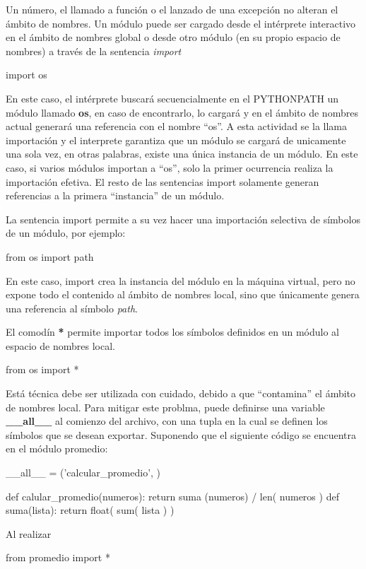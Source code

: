 \documentclass[a4paper]{report}
\begin{document}
Un número, el llamado a función o el lanzado de una excepción no alteran el ámbito de nombres.
Un módulo puede ser cargado desde el intérprete interactivo en el ámbito de nombres global
o desde otro módulo (en su propio espacio de nombres) a través de 
la sentencia \emph{import}
\begin{python}
import os
\end{python}
En este caso, el intérprete buscará secuencialmente en el PYTHONPATH un módulo llamado \textbf{os}, 
en caso de encontrarlo, lo cargará y en el ámbito de nombres actual generará una referencia con el 
nombre ``os''. A esta actividad se la llama importación y el interprete garantiza que un módulo
se cargará de unicamente una sola vez, en otras palabras, existe una única instancia de un módulo.
En este caso, si varios módulos importan a ``os'', solo la primer ocurrencia realiza la importación efetiva.
El resto de las sentencias import solamente generan referencias a la primera ``instancia'' de un módulo.

La sentencia import permite a su vez hacer una importación selectiva de símbolos de un módulo, 
por ejemplo:
\begin{python}
 from os import path
\end{python}
En este caso, import crea la instancia del módulo en la máquina virtual, pero no expone todo el contenido
al ámbito de nombres local, sino que únicamente genera una referencia al símbolo \emph{path}.

El comodín \textbf{*} permite importar todos los símbolos definidos en un módulo al espacio de nombres local.
\begin{python}
 from os import *
\end{python}

Está técnica debe ser utilizada con cuidado, debido a que ``contamina'' el ámbito de nombres local. Para
mitigar este problma, puede definirse una variable \textbf{\_\_all\_\_} al comienzo del archivo, con una tupla
en la cual se definen los símbolos que se desean exportar. Suponendo que el siguiente código se encuentra
en el módulo promedio:

\begin{python}
__all__ = ('calcular_promedio', )

def calular_promedio(numeros):
    return suma (numeros) / len( numeros )
def suma(lista):
    return float( sum( lista ) ) 
\end{python}

Al realizar
\begin{python}
 from promedio import *
\end{python}
\end{document}
